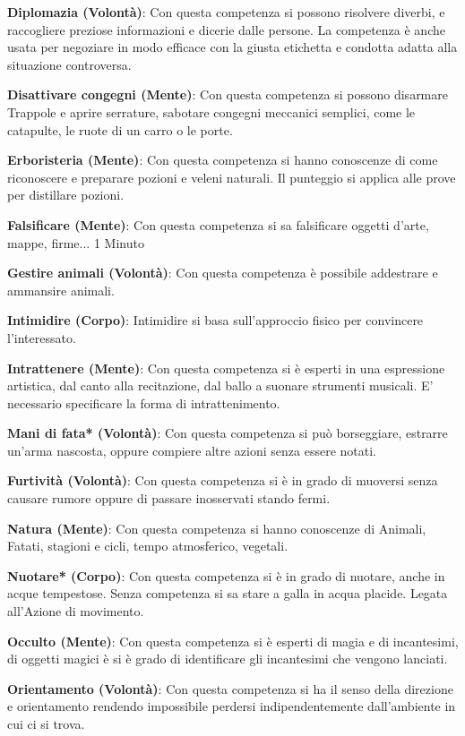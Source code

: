 \documentclass[12pt,a4paper,twoside,openany]{book}
\begin{document}
\begin{multicols}{2}
\textbf{Diplomazia (Volontà)}: Con questa competenza si possono risolvere diverbi, e raccogliere preziose informazioni e dicerie dalle persone. La competenza è anche usata per negoziare in modo efficace con la giusta etichetta e condotta adatta alla situazione controversa. 

\textbf{Disattivare congegni (Mente)}: Con questa competenza si possono disarmare Trappole e aprire serrature, sabotare congegni meccanici semplici, come le catapulte, le ruote di un carro o le porte.

\textbf{Erboristeria (Mente)}: Con questa competenza si hanno conoscenze di come riconoscere e preparare pozioni e veleni naturali. Il punteggio si applica alle prove per distillare pozioni.

\textbf{Falsificare (Mente)}: Con questa competenza si sa falsificare oggetti d'arte, mappe, firme... 1 Minuto

\textbf{Gestire animali (Volontà)}: Con questa competenza è possibile addestrare e ammansire animali.

\textbf{Intimidire (Corpo)}: Intimidire si basa sull'approccio fisico per convincere l'interessato. 

\textbf{Intrattenere (Mente)}: Con questa competenza si è esperti in una espressione artistica, dal canto alla recitazione, dal ballo a suonare strumenti musicali. E' necessario specificare la forma di intrattenimento.

\textbf{Mani di fata* (Volontà)}: Con questa competenza si può borseggiare, estrarre un'arma nascosta, oppure compiere altre azioni senza essere notati. 

\textbf{Furtività (Volontà)}: Con questa competenza si è in grado di muoversi senza causare rumore oppure di passare inosservati stando fermi. 

\textbf{Natura (Mente)}: Con questa competenza si hanno conoscenze di Animali, Fatati, stagioni e cicli, tempo atmosferico, vegetali. 

\textbf{Nuotare* (Corpo)}: Con questa competenza si è in grado di nuotare, anche in acque tempestose. Senza competenza si sa stare a galla in acqua placide. Legata all'Azione di movimento.

\textbf{Occulto (Mente)}: Con questa competenza si è esperti di magia e di incantesimi, di oggetti magici è si è grado di identificare gli incantesimi che vengono lanciati. 

\textbf{Orientamento (Volontà)}: Con questa competenza si ha il senso della direzione e orientamento rendendo impossibile perdersi indipendentemente dall'ambiente in cui ci si trova. 


\end{multicols}
\end{document}
